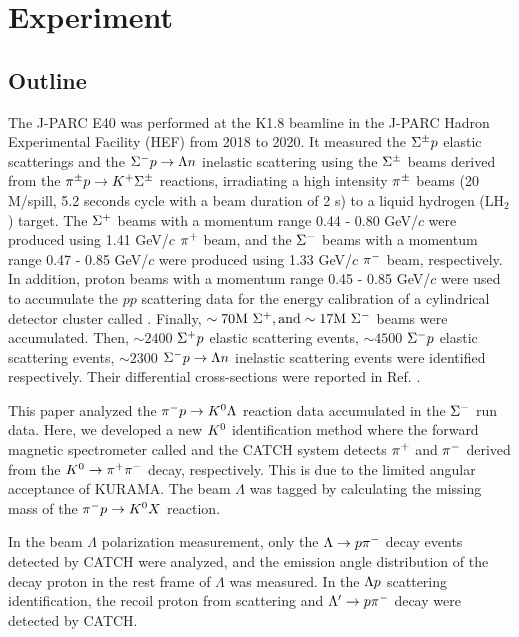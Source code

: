 %
\graphicspath{{./pictures/chapter2/}}

\chapter{Experiment} 
\label{chap-exp}

\section{Outline}
The J-PARC E40 was performed at the K1.8 beamline in the J-PARC Hadron Experimental Facility (HEF) from 2018 to 2020. It measured the $\Sigma^{\pm}p$ elastic scatterings and the $\Sigma^- p \to \Lambda n$ inelastic scattering using the $\Sigma^{\pm}$ beams derived from the $\pi^{\pm}p \to K^+ \Sigma^{\pm}$ reactions, irradiating a high intensity $\pi^{\pm}$ beams (20 M/spill, 5.2 seconds cycle with a beam duration of 2 s) to a liquid hydrogen (LH$_2$) target. The $\Sigma^{+}$ beams with a momentum range 0.44 - 0.80 GeV/$c$ were produced using 1.41 GeV/$c$ $\pi^{+}$ beam, and the $\Sigma^{-}$ beams with a momentum range 0.47 - 0.85 GeV/$c$ were produced using 1.33 GeV/$c$ $\pi^{-}$ beam, respectively. In addition, proton beams with a momentum range 0.45 - 0.85 GeV/$c$ were used to accumulate the $pp$ scattering data for the energy calibration of a cylindrical detector cluster called  \cite{Aka-2020}. Finally, $\sim70 \rm{M}\ \Sigma^{+}, and \sim17 \rm{M}\ \Sigma^{-}$ beams were accumulated. Then,  $\sim2400$ $\Sigma^{+}p$ elastic scattering events, $\sim4500$ $\Sigma^{-}p$ elastic scattering events, $\sim2300$ $\Sigma^- p \to \Lambda n$ inelastic scattering events were identified respectively. Their differential cross-sections were reported in Ref. \cite{Nana-SPp, Miwa-SMp, Miwa-SMLn}.

This paper analyzed the $\pi^- p \to K^0 \Lambda$ reaction data accumulated in the $\Sigma^{-}$ run data. Here, we developed a new $K^{0}$ identification method where the forward magnetic spectrometer called  and the CATCH system detects $\pi^{+}$ and $\pi^{-}$ derived from the $K^0 \to \pi^+ \pi^-$ decay, respectively. This is due to the limited angular acceptance of KURAMA. The beam $\Lambda$ was tagged by calculating the missing mass of the $\pi^- p \to K^0 X$ reaction. 

In the beam $\Lambda$ polarization measurement, only the $\Lambda\to p\pi^{-}$ decay events detected by CATCH were analyzed, and the emission angle distribution of the decay proton in the rest frame of $\Lambda$ was measured. In the $\Lambda p$ scattering identification, the recoil proton from scattering and $\Lambda'\to p\pi^{-}$ decay were detected by CATCH. 


